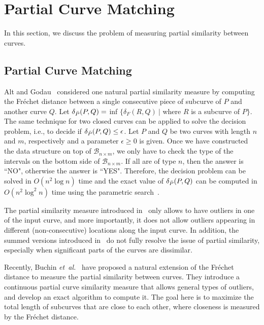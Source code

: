 \documentclass[12pt]{dalthesis}
\newcommand{\etal}{{\em et~al.\/}}
\newcommand{\CB}{{\mathscr B}}
\newcommand{\Frechet}{Fr\'echet }
\newcommand{\distF}{\delta_F}
\newcommand{\BNM}{\CB_{n \times m}}
\begin{document}
 

















\section{Partial Curve Matching}
\label{sec:RelatedPartial}
In this section, we discuss the problem
of measuring partial similarity between curves.

 

\subsection{Partial Curve Matching}
\label{sec:RelatedPartialMain}
Alt and Godau~\cite{AltG95} considered one natural partial similarity 
measure by computing the \Frechet distance between a single 
consecutive piece of subcurve of $P$ and another curve $Q$. 
Let $\delta_{\bar{P}}(P,Q) =$ inf $\{ \distF(R,Q) \ |$ where $R$ is a subcurve of $P \}$. 
The same technique for two closed curves 
 can be applied to solve the decision problem, i.e., to decide if $\delta_{\bar{P}}(P,Q) \le \epsilon$. Let  $P$
and $Q$ be two curves with length $n$ and $m$, respectively and a parameter $\epsilon \ge 0$ is given. Once we have constructed 
the data structure on top of $\BNM$, 
we only have to check the type of the intervals on the bottom side of 
$\BNM$. If all are of type $n$, then the answer is ``NO", otherwise the 
answer is ``YES". Therefore, the decision problem can be solved in  $O(n^2\log n)$ time and the exact value of $\delta_{\bar{P}}(P,Q)$ 
can be computed in $O(n^2\log^2 n)$ time using the 
parametric search~\cite{AltG95}.

The partial similarity measure introduced in~\cite{AltG95}  
only allows to have outliers in one of the input curve, and more importantly, 
it does not allow outliers
appearing in different (non-consecutive) locations along the input curve. 
In addition, the summed versions introduced in~\cite{SumFD} do 
not fully resolve the issue of partial similarity, especially when significant parts 
of the curves are dissimilar. 

Recently, Buchin \etal~\cite{ExactPartial} have
proposed a natural extension of the
\Frechet distance to measure the partial similarity between
curves. 
They introduce a continuous
partial curve similarity measure that allows general
types of outliers, and develop an exact algorithm to
compute it. The goal here is to maximize the total length of 
subcurves that are close to each other, where closeness is measured by 
the \Frechet distance. 
\end{document}
